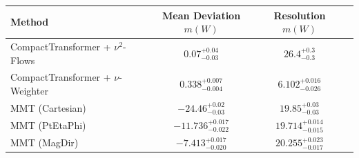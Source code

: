     \begin{tabular}{lccc}
        \toprule
        Method & Mean Deviation $m(W)$ & Resolution $m(W)$ \\
        \midrule
        CompactTransformer + $\nu^2$-Flows & $0.07^{+0.04}_{-0.03}$ & $26.4^{+0.3}_{-0.3}$ \\
        CompactTransformer + $\nu$-Weighter & $0.338^{+0.007}_{-0.004}$ & $6.102^{+0.016}_{-0.026}$ \\
        MMT (Cartesian) & $-24.46^{+0.02}_{-0.03}$ & $19.85^{+0.03}_{-0.03}$ \\
        MMT (PtEtaPhi) & $-11.736^{+0.017}_{-0.022}$ & $19.714^{+0.014}_{-0.015}$ \\
        MMT (MagDir) & $-7.413^{+0.017}_{-0.020}$ & $20.255^{+0.023}_{-0.017}$ \\
        \bottomrule
    \end{tabular}